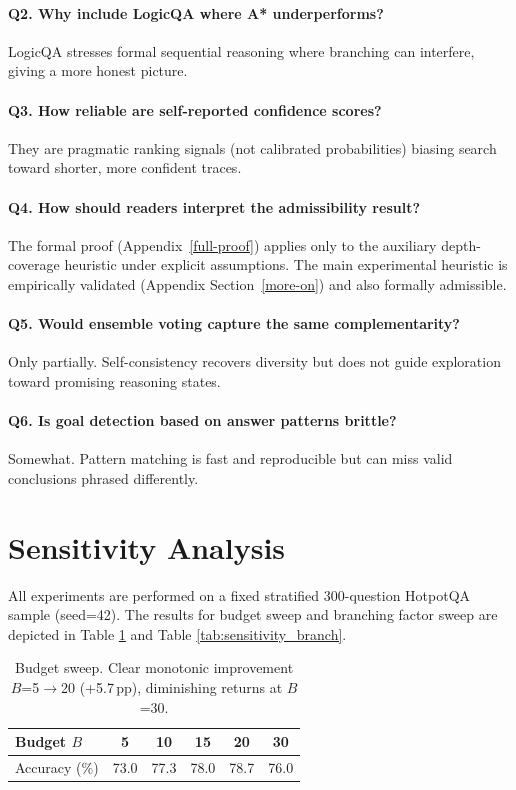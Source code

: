 \documentclass[10pt]{article}
\begin{document}
\paragraph{Q2. Why include LogicQA where A* underperforms?}
LogicQA stresses formal sequential reasoning where branching can interfere, giving a more honest picture.

\paragraph{Q3. How reliable are self-reported confidence scores?}
They are pragmatic ranking signals (not calibrated probabilities) biasing search toward shorter, more confident traces.

\paragraph{Q4. How should readers interpret the admissibility result?}
The formal proof (Appendix~\ref{full-proof}) applies only to the auxiliary depth-coverage heuristic under explicit assumptions. The main experimental heuristic is empirically validated (Appendix Section~\ref{more-on}) and also formally admissible.

\paragraph{Q5. Would ensemble voting capture the same complementarity?}
Only partially. Self-consistency recovers diversity but does not guide exploration toward promising reasoning states.

\paragraph{Q6. Is goal detection based on answer patterns brittle?}
Somewhat. Pattern matching is fast and reproducible but can miss valid conclusions phrased differently.

\section{Sensitivity Analysis}
\label{app:sensitivity}

All experiments are performed on a fixed stratified 300-question HotpotQA sample (seed=42). The results for budget sweep and branching factor sweep are depicted in Table \ref{tab:sensitivity_budget} and Table \ref{tab:sensitivity_branch}.

\begin{table}[ht]
\centering
\small
\begin{tabular}{lccccc}
\toprule
\textbf{Budget $B$} & 5 & 10 & 15 & 20 & 30 \\
\midrule
Accuracy (\%) & 73.0 & 77.3 & 78.0 & 78.7 & 76.0 \\
\bottomrule
\end{tabular}
\caption{Budget sweep. Clear monotonic improvement $B$=5$\to$20 (+5.7\,pp), diminishing returns at $B$=30.}
\label{tab:sensitivity_budget}
\end{table}
\end{document}
